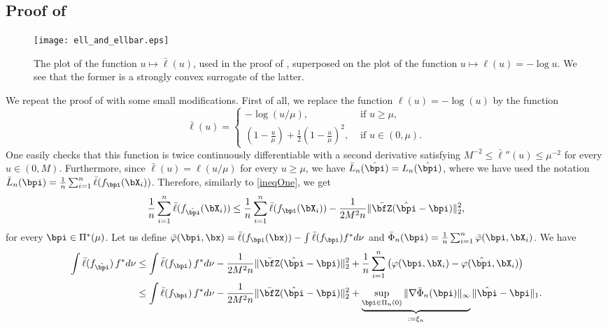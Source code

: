 \subsection{Proof of }
\label{ssec:proof:prop2}
\begin{figure}
\begin{center}
\texttt{[image: ell\_and\_ellbar.eps]}
\caption{The plot of the function $u\mapsto\bar\ell(u)$, used in the proof of
, superposed on the plot of the function $u\mapsto\ell(u)=-\log u$.
We see that the former is a strongly convex surrogate of the latter.}
\label{fig:ell}
\end{center}
\end{figure}
We repeat the proof of  with some small modifications. First of all, we replace the
function $\ell(u) = -\log(u)$ by the function
\begin{equation}\label{elBar}
\bar\ell(u) =
\begin{cases}
- \log(u/\mu), & \text{ if } u\ge \mu,\\
(1-\frac{u}{\mu})+\frac12(1-\frac{u}{\mu})^2, & \text{ if } u\in(0,\mu).
\end{cases}
\end{equation}
One easily checks that this function is twice continuously differentiable with a second
derivative satisfying $M^{-2}\le \bar\ell''(u)\le \mu^{-2}$ for every $u\in(0,M)$.
Furthermore, since $\bar\ell(u) = \ell(u/\mu)$ for every $u\ge \mu$, we have
$\bar L_n(\hat\bpi) = L_n(\hat\bpi)$, where we have used the notation $\bar L_n(\bpi)
= \frac1n\sum_{i=1}^n \bar\ell(f_{\bpi}(\bX_i))$. Therefore, similarly to \eqref{ineqOne},
we get
\begin{equation}\label{ineqOneb}
    \frac{1}{n}\sum_{i=1}^n \bar\ell(f_{\hat\bpi}(\bX_i)) \leq
    \frac{1}{n}\sum_{i=1}^n \bar\ell(f_{\bpi}(\bX_i)) -
    \frac{1}{2M^2n}\|\bar\bfZ(\hat\bpi-\bpi)\|^2_2,
\end{equation}
for every $\bpi\in\Pi^*(\mu)$. Let us define $\bar \varphi(\bpi,\bx) = \bar\ell(f_{\bpi}(\bx))-
\int \bar\ell(f_{\bpi})f^*d\nu$ and $\bar\Phi_n(\bpi) = \frac1n\sum_{i=1}^n
\bar\varphi(\bpi,\bX_i)$. We have
\begin{align}
\int \bar\ell(f_{\hat\bpi})\,f^*d\nu
    &\leq \int \bar\ell(f_{\bpi})\,f^*d\nu-\frac{1}{2M^2n}\|\bar\bfZ(\hat\bpi-\bpi)\|_2^2
        + \frac1n\sum_{i=1}^n \big(\varphi(\bpi,\bX_i)-\varphi(\hat\bpi,\bX_i)\big)\label{tempOraclIneqb}\\
    &\leq \int \bar\ell(f_{\bpi})\,f^*d\nu-\frac{1}{2M^2n}\|\bar\bfZ(\hat\bpi-\bpi)\|_2^2
        +\underbrace{\sup_{\bpi\in \Pi_n(0)}\|\nabla\bar\Phi_n(\bpi)\|_\infty}_{:=\xi_n} \|\hat\bpi-\bpi \|_1.
\end{align}
